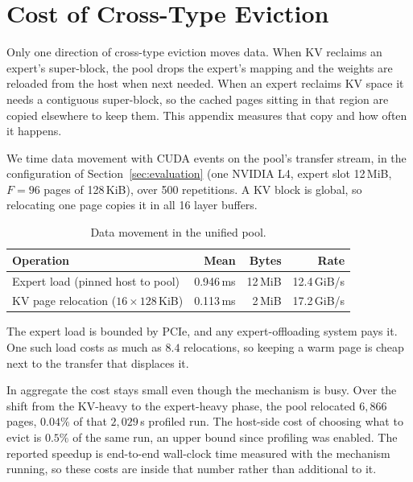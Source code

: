 \appendix

\section{Cost of Cross-Type Eviction}
\label{app:cost}

Only one direction of cross-type eviction moves data. When KV reclaims an
expert's super-block, the pool drops the expert's mapping and the weights
are reloaded from the host when next needed. When an expert reclaims KV
space it needs a contiguous super-block, so the cached pages sitting in
that region are copied elsewhere to keep them. This appendix measures that
copy and how often it happens.

We time data movement with CUDA events on the pool's transfer stream, in
the configuration of Section~\ref{sec:evaluation} (one NVIDIA L4, expert
slot 12\,MiB, $F=96$ pages of 128\,KiB), over 500 repetitions. A KV block
is global, so relocating one page copies it in all 16 layer buffers.

\begin{table}[h]
\centering
\caption{Data movement in the unified pool.}
\label{tab:cost}
\small
\begin{tabular}{l r r r}
\toprule
\textbf{Operation} & \textbf{Mean} & \textbf{Bytes} & \textbf{Rate} \\
\midrule
Expert load (pinned host to pool) & 0.946\,ms & 12\,MiB & 12.4\,GiB/s \\
KV page relocation ($16\times128$\,KiB) & 0.113\,ms & 2\,MiB & 17.2\,GiB/s \\
\bottomrule
\end{tabular}
\end{table}

The expert load is bounded by PCIe, and any expert-offloading system pays
it. One such load costs as much as $8.4$ relocations, so keeping a warm
page is cheap next to the transfer that displaces it.

In aggregate the cost stays small even though the mechanism is busy. Over
the shift from the KV-heavy to the expert-heavy phase, the pool relocated
$6{,}866$ pages, $0.04\%$ of that $2{,}029$\,s profiled run. The host-side
cost of choosing what to evict is $0.5\%$ of the same run, an upper bound
since profiling was enabled. The reported speedup is end-to-end
wall-clock time measured with the mechanism running, so these costs are
inside that number rather than additional to it.
